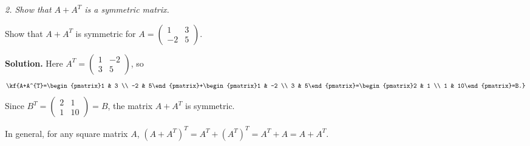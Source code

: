 \emph{2. Show that $A + A^{T}$ is a symmetric matrix.}
\begin{misol}
Show that $A+A^{T}$ is symmetric for $A=\begin{pmatrix}1 & 3 \\ -2 & 5\end{pmatrix}$.

\textbf{Solution.} Here $A^{T}=\begin{pmatrix}1 & -2 \\ 3 & 5\end{pmatrix}$, so
\[\kf{A+A^{T}=\begin{pmatrix}1 & 3 \\ -2 & 5\end{pmatrix}+\begin{pmatrix}1 & -2 \\ 3 & 5\end{pmatrix}=\begin{pmatrix}2 & 1 \\ 1 & 10\end{pmatrix}=B.}\]
Since $B^{T}=\begin{pmatrix}2 & 1 \\ 1 & 10\end{pmatrix}=B$, the matrix $A+A^{T}$ is symmetric.

In general, for any square matrix $A$,
$(A+A^{T})^{T}=A^{T}+(A^{T})^{T}=A^{T}+A=A+A^{T}$.
\end{misol}
